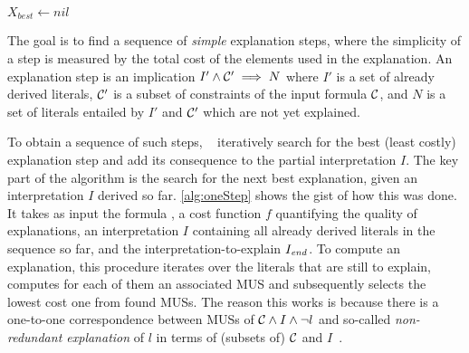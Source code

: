 \newcommand\onestep{\ensuremath{\call{explain-One-Step}}\xspace}

\begin{algorithm}[t]
  \caption{$\onestep(\formulac,f,I,\Iend)$}
  \label{alg:oneStep}
$X_{best} \gets \mathit{nil}$\;
\end{algorithm}


The goal is to find a sequence of \textit{simple} explanation steps, where the simplicity of a step is measured by the total cost of the elements used in the explanation.
An explanation step is an implication $I' \wedge \mathcal{C} ' \implies N$ where $I'$ is a set of already derived literals, $\mathcal{C} '$ is a subset of constraints of the input formula $\mathcal{C} $, and $N$ is a set of literals entailed by $I'$ and $\mathcal{C} '$ which are not yet explained.

To obtain a sequence of such steps, ~\citet{ecai/BogaertsGCG20} iteratively search for the best (least costly) explanation step and add its consequence to the partial interpretation $I$.
%
The key part of the algorithm is the search for the next best explanation, given an interpretation $I$ derived so far. 
\cref{alg:oneStep} shows the gist of how this was done.
It takes as input the formula \formulac, a cost function $f$ quantifying the quality of explanations, an interpretation $I$ containing all already derived literals in the sequence so far, and the interpretation-to-explain $I_\mathit{end} $. 
To compute an explanation, this procedure iterates over the literals that are still to explain, computes for each of them an associated MUS and subsequently selects the lowest cost one from found MUSs.
The reason this works is because there is a one-to-one correspondence between MUSs of $\mathcal{C}  \land I \land \neg l$ and so-called \emph{non-redundant explanation} of $l$ in terms of (subsets of) $\mathcal{C} $ and $I$~\cite{ecai/BogaertsGCG20}. 

